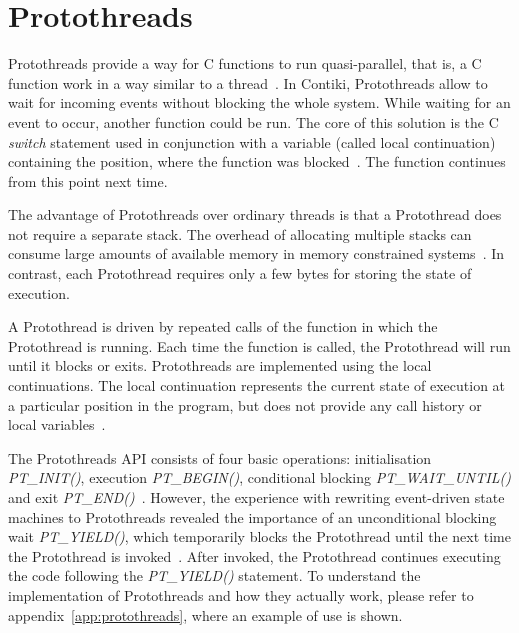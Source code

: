 
\section{Protothreads}\label{sec:contiki-protothreads}
Protothreads provide a way for C functions to run quasi-parallel,
that is, a C function work in a way similar to a thread~\cite{paper-protothreads}.
In Contiki, Protothreads allow to wait for incoming events without blocking the whole system.
While waiting for an event to occur, another function could be run.
The core of this solution is the C {\it switch} statement used in conjunction with a variable (called local continuation)
containing the position, where the function was blocked~\cite{paper-protothreads}.
The function continues from this point next time.

The advantage of Protothreads over ordinary threads is that a Protothread does not require a separate stack.
The overhead of allocating multiple stacks can consume large amounts of
available memory in memory constrained systems~\cite{paper-protothreads}.
In contrast, each Protothread requires only a few bytes for storing the state of execution.

A Protothread is driven by repeated calls of the function in which the Protothread is running. %
Each time the function is called, the Protothread will run until it blocks or exits.
Protothreads are implemented using the local continuations. The local continuation represents the current state
of execution at a particular position in the program, but does not provide any call history or local variables~\cite{contiki-docs}.

The Protothreads API consists of four basic operations: initialisation {\it{PT\_INIT()}}, execution {\it{PT\_BEGIN()}},
conditional blocking {\it{PT\_WAIT\_UNTIL()}} and exit {\it{PT\_END()}}~\cite{paper-protothreads}.
However, the experience with rewriting event-driven state machines to Protothreads revealed %
the importance of an unconditional blocking wait {\it{PT\_YIELD()}},
which temporarily blocks the Protothread until the next time the Protothread is invoked~\cite{thesis-programming}.
After invoked, the Protothread continues executing the code following the {\it{PT\_YIELD()}} statement. %
To understand the implementation of Protothreads and how they actually work,
please refer to appendix~\ref{app:protothreads}, where an example of use is shown.

